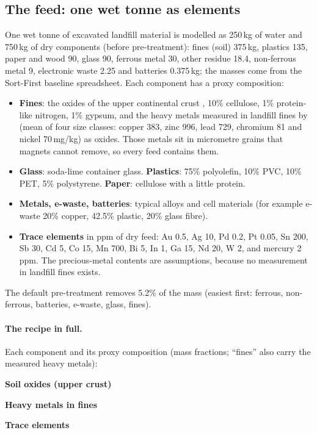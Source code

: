\documentclass[11pt,a4paper]{article}
\begin{document}
\subsection{The feed: one wet tonne as elements}
One wet tonne of excavated landfill material is modelled as 250\,kg of water and 750\,kg of dry components (before pre-treatment): fines (soil) 375\,kg, plastics 135, paper and wood 90, glass 90, ferrous metal 30, other residue 18.4, non-ferrous metal 9, electronic waste 2.25 and batteries 0.375\,kg; the masses come from the Sort-First baseline spreadsheet. Each component has a proxy composition:
\begin{itemize}
\item \textbf{Fines}: the oxides of the upper continental crust \citep{rudnick2003}, 10\% cellulose, 1\% protein-like nitrogen, 1\% gypsum, and the heavy metals measured in landfill fines by \citet{vollprecht2020} (mean of four size classes: copper 383, zinc 996, lead 729, chromium 81 and nickel 70\,mg/kg) as oxides. Those metals sit in micrometre grains that magnets cannot remove, so every feed contains them.
\item \textbf{Glass}: soda-lime container glass. \textbf{Plastics}: 75\% polyolefin, 10\% PVC, 10\% PET, 5\% polystyrene. \textbf{Paper}: cellulose with a little protein.
\item \textbf{Metals, e-waste, batteries}: typical alloys and cell materials (for example e-waste 20\% copper, 42.5\% plastic, 20\% glass fibre).
\item \textbf{Trace elements} in ppm of dry feed: Au 0.5, Ag 10, Pd 0.2, Pt 0.05, Sn 200, Sb 30, Cd 5, Co 15, Mn 700, Bi 5, In 1, Ga 15, Nd 20, W 2, and mercury 2\,ppm. The precious-metal contents are assumptions, because no measurement in landfill fines exists.
\end{itemize}
The default pre-treatment removes 5.2\% of the mass (easiest first: ferrous, non-ferrous, batteries, e-waste, glass, fines).

\paragraph{The recipe in full.} Each component and its proxy composition (mass fractions; ``fines'' also carry the measured heavy metals):

\begin{center}
\begin{minipage}[t]{0.3\textwidth}\centering\textbf{Soil oxides (upper crust)}\\[3pt]\end{minipage}\hfill
\begin{minipage}[t]{0.3\textwidth}\centering\textbf{Heavy metals in fines}\\[3pt]\end{minipage}\hfill
\begin{minipage}[t]{0.36\textwidth}\centering\textbf{Trace elements}\\[3pt]\end{minipage}
\end{center}
\end{document}
